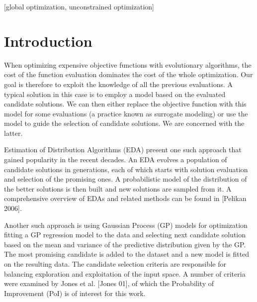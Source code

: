 \documentclass{sig-alternate}
\begin{document}
\maketitle
\begin{abstract}
XYZ is a novel expensive black-box optimization method based on
a combination of ideas from Estimation of Distribution Algorithms and
global optimization methods using Gaussian Processes. The algorithm
is described and its implementation tested on three benchmark functions
as a proof of concept.
\end{abstract}

[global optimization,
unconstrained optimization]


\section{Introduction}

When optimizing expensive objective functions with evolutionary algorithms, the cost of the function 
evaluation dominates the cost of the whole optimization. Our goal is therefore to exploit the knowledge 
of all the previous evaluations. A typical solution in this case is to employ a model based on the evaluated 
candidate solutions. We can then either replace the objective function  with this model for some 
evaluations (a practice known as surrogate modeling) or use the model to guide the selection of candidate 
solutions. We are concerned with the latter.

Estimation of Distribution Algorithms (EDA) present one such approach that gained popularity in the recent
decades. An EDA evolves a population of candidate solutions in generations, each of which starts with solution
evaluation and selection of the promising ones. A probabilistic model of the distribution of the better solutions 
is then built and new solutions are sampled from it. A comprehensive overview of EDAs and related 
methods can be found in [Pelikan 2006].

Another such approach is using Gaussian Process (GP) models for optimization fitting a GP regression model to the 
data and selecting next candidate solution based on the mean and variance of the predictive distribution given 
by the GP. The most promising candidate is added to the dataset and a new model is fitted on the resulting data. 
The candidate selection criteria are responsible for balancing exploration and exploitation of the input space. 
A number of criteria were examined by Jones et al. [Jones 01], of which the Probability of Improvement (PoI) 
is of interest for this work.
\end{document}
